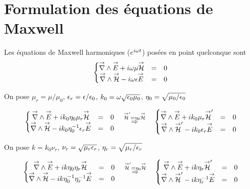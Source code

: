 \section{Formulation des équations de Maxwell}

Les équations de Maxwell harmoniques (\(e^{i\w t}\)) posées en point quelconque sont
\begin{equation}
  \left\lbrace \begin{matrix}
  \vrot \vE + i\w\mu \vH &=& 0 \\
  \vrot \vH - i\w\eps \vE &=& 0 \\
  \end{matrix} \right.
\end{equation}

On pose \(\mu_r = \mu \slash \mu_0\), \(\eps_r = \eps \slash \eps_0\), \(k_0 = \w \sqrt {\eps_0\mu_0}\), \(\eta_0=\sqrt {\mu_0/\eps_0}\)

\begin{equation}
\left\lbrace \begin{matrix}
\vrot \vE + ik_0\eta_0\mu_r \vH &=& 0 \\
\vrot \vH - ik_0\eta_0^{-1}\eps_r \vE &=& 0 \\
\end{matrix} \right.
\quad
\overset{\vH' = \eta_0 \vH}{\Rightarrow}
\quad
\left\lbrace \begin{matrix}
\vrot \vE + ik_0\mu_r \vH' &=& 0 \\
\vrot \vH' - ik_0\eps_r \vE &=& 0 \\
\end{matrix} \right.
\end{equation}

On pose \(k=k_0\nu_r\), \(\nu_r = \sqrt{\mu_r\eps_r}\), \(\eta_r = \sqrt{\mu_r \slash \eps_r}\)

\begin{equation}
\left\lbrace \begin{matrix}
\vrot \vE + ik\eta_0\eta_r \vH &=& 0 \\
\vrot \vH - ik\eta_0^{-1}\eta_r^{-1} \vE &=& 0 \\
\end{matrix} \right.
\quad
\overset{\vH' = \eta_0 \vH}{\Rightarrow}
\quad
\left\lbrace \begin{matrix}
\vrot \vE + ik\eta_r \vH' &=& 0 \\
\vrot \vH' - ik\eta_r^{-1} \vE &=& 0 \\
\end{matrix} \right.
\end{equation}